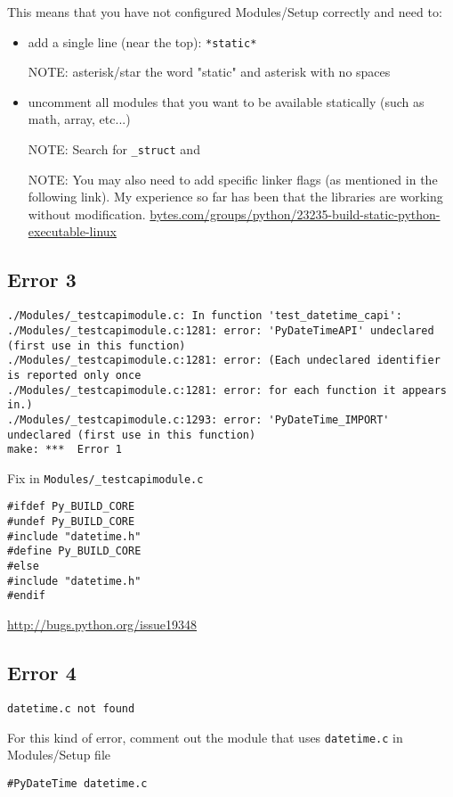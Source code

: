 This means that you have not configured Modules/Setup correctly and need to:
\begin{itemize}
  \item add a single line (near the top): \verb!*static*! 
  
NOTE:  asterisk/star the word "static" and asterisk with no spaces
  
  \item uncomment all modules that you want to be available statically (such as
  math, array, etc...)
  
NOTE: Search for \verb!_struct! and 


NOTE: You may also need to add specific linker flags (as mentioned in the
following link). My experience so far has been that the libraries are working
without modification.
\url{bytes.com/groups/python/23235-build-static-python-executable-linux}


\end{itemize}


\subsection{Error 3}

\begin{verbatim}
./Modules/_testcapimodule.c: In function 'test_datetime_capi':
./Modules/_testcapimodule.c:1281: error: 'PyDateTimeAPI' undeclared (first use in this function)
./Modules/_testcapimodule.c:1281: error: (Each undeclared identifier is reported only once
./Modules/_testcapimodule.c:1281: error: for each function it appears in.)
./Modules/_testcapimodule.c:1293: error: 'PyDateTime_IMPORT' undeclared (first use in this function)
make: ***  Error 1
\end{verbatim}


Fix in \verb!Modules/_testcapimodule.c!

\begin{verbatim}
#ifdef Py_BUILD_CORE
#undef Py_BUILD_CORE
#include "datetime.h"
#define Py_BUILD_CORE
#else
#include "datetime.h"
#endif
\end{verbatim}
\url{http://bugs.python.org/issue19348}


\subsection{Error 4}


\begin{verbatim}
datetime.c not found
\end{verbatim}

For this kind of error, comment out the module that uses \verb!datetime.c! in
Modules/Setup file
\begin{verbatim}
#PyDateTime datetime.c
\end{verbatim}
